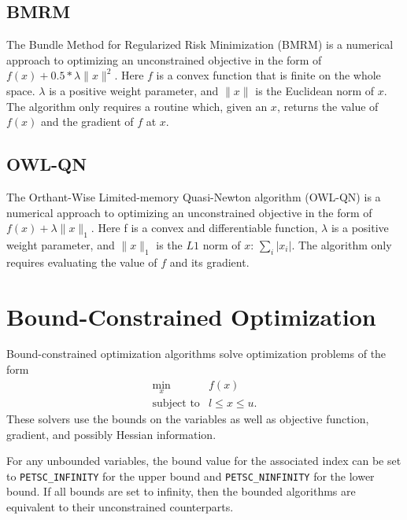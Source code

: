 \subsection{BMRM}
The Bundle Method for Regularized Risk Minimization (BMRM)\cite{brmrm} is a 
numerical approach to optimizing an unconstrained objective in the form of 
$f(x) + 0.5 * \lambda \| x \|^2$.  Here $f$ is a convex function that is finite on 
the whole space.  $\lambda$ is a positive 
weight parameter, and $\| x \|$ is the Euclidean norm of $x$.  The algorithm only 
requires a routine which, given an $x$, returns the value of $f(x)$ and the 
gradient of $f$ at $x$.

\subsection{OWL-QN}
The Orthant-Wise Limited-memory Quasi-Newton algorithm (OWL-QN)\cite{owlqn}
is a numerical approach to optimizing an unconstrained objective in the 
form of $f(x) + \lambda \|x\|_1$.  Here f is a convex and differentiable 
function, $\lambda$ is a positive weight parameter, and $\| x \|_1$ is the 
$L1$ norm of $x$: $\sum_i |x_i|$.  The algorithm only requires evaluating the 
value of $f$ and its gradient.

\section{Bound-Constrained Optimization}
\label{chapter:bound}

Bound-constrained optimization algorithms solve optimization problems of the form
\[
\begin{array}{ll} \displaystyle
\min_{x} & f(x) \\
\mbox{subject to} & l \leq x \leq u.
\end{array}
\]
These solvers use the bounds on the variables as well as objective
function, gradient, and possibly Hessian information.

For any unbounded variables, the bound value for the associated index can be set 
to {\tt PETSC\_INFINITY} for the upper bound and {\tt PETSC\_NINFINITY} for the lower 
bound. If all bounds are set to infinity, then the bounded algorithms are equivalent 
to their unconstrained counterparts.

